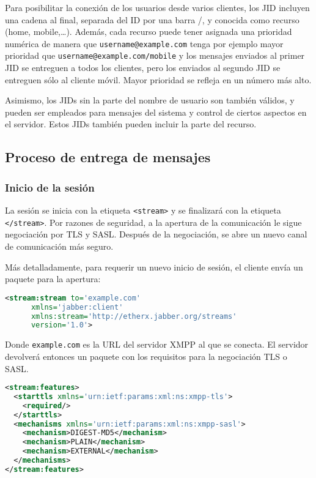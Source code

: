 \documentclass[a4paper, 11pt]{article} %
\begin{document}
  Para posibilitar la conexión de los usuarios desde varios clientes, los JID incluyen una cadena al final, separada
  del ID por una barra /, y conocida como recurso (home, mobile,\ldots). Además, cada recurso puede
  tener asignada una prioridad numérica de manera que \texttt{username@example.com} tenga por ejemplo mayor prioridad que 
  \texttt{username@example.com/mobile} y los mensajes enviados al primer JID se entreguen a todos los clientes,
  pero los enviados al segundo JID se entreguen sólo al cliente móvil. Mayor prioridad se refleja en un número más alto.
  
  Asimismo, los JIDs sin la parte del nombre de usuario son también válidos, y pueden ser empleados para mensajes del
  sistema y control de ciertos aspectos en el servidor. Estos JIDs también pueden incluir la parte del recurso.
  
  
  \subsection{Proceso de entrega de mensajes}
    \subsubsection{Inicio de la sesión}
      La sesión se inicia con la etiqueta \texttt{<stream>} y se finalizará con la etiqueta
      \texttt{</stream>}. Por razones de seguridad, a la apertura de la comunicación le sigue
      negociación por TLS y SASL. Después de la negociación, se abre un nuevo canal de comunicación
      más seguro.
      
      Más detalladamente, para requerir un nuevo inicio de sesión, el cliente envía un paquete para la apertura:
      \begin{lstlisting}[language=XML] 
<stream:stream to='example.com' 
	  xmlns='jabber:client'
	  xmlns:stream='http://etherx.jabber.org/streams'
	  version='1.0'>
      \end{lstlisting}
      Donde \texttt{example.com} es la URL del servidor XMPP al que se conecta. El servidor
      devolverá entonces un paquete con los requisitos para la negociación TLS o SASL.
      \begin{lstlisting}[language=XML]
<stream:features> 
  <starttls xmlns='urn:ietf:params:xml:ns:xmpp-tls'>    
    <required/>  
  </starttls>  
  <mechanisms xmlns='urn:ietf:params:xml:ns:xmpp-sasl'>    
    <mechanism>DIGEST-MD5</mechanism>    
    <mechanism>PLAIN</mechanism>   
    <mechanism>EXTERNAL</mechanism>  
  </mechanisms> 
</stream:features>
      \end{lstlisting}
\end{document}
